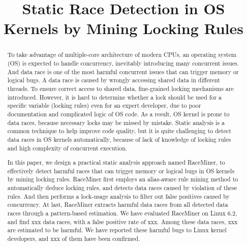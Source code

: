 \documentclass[pageno]{jpaper}
\newcommand{\sys}{\mbox{RaceMiner}\xspace}
\begin{document}
\title{
Static Race Detection in OS Kernels by Mining Locking Rules}

\date{}
\maketitle

\thispagestyle{empty}

\begin{abstract}
	
To take advantage of multiple-core architecture of modern CPUs, an operating 
system (OS) is expected to handle concurrency, inevitably introducing many 
concurrent issues. And data race is one of the most harmful concurrent issues 
that can trigger memory or logical bugs. A data race is caused by wrongly 
accessing shared data in different threads. To ensure correct access to shared 
data, fine-grained locking mechanisms are introduced. However, it is hard to 
determine whether a lock should be used for a specific variable (locking rules) 
even for an expert developer, due to poor documentation and complicated logic 
of OS code. As a result, OS kernel is prone to data races, because necessary 
locks may be missed by mistake. Static analysis is a common technique to help 
improve code quality, but it is quite challenging to detect data races in OS 
kernels automatically, because of lack of knowledge of locking rules and high 
complexity of concurrent execution.

In this paper, we design a practical static analysis approach named \sys, to 
effectively detect harmful races that can trigger memory or logical bugs in OS 
kernels by mining locking rules. \sys first employs an alias-aware rule mining 
method to automatically deduce locking rules, and detects data races caused by 
violation of these rules. And then performs a lock-usage analysis to filter out 
false positives caused by concurrency. At last, \sys extracts harmful data 
races from all detected data races through a pattern-based estimation. We have 
evaluated \sys on Linux 6.2, and find xxx data races, with a false positive 
rate of xxx. Among these data races, xxx are estimated to be harmful. We have 
reported these harmful bugs to Linux kernel developers, and xxx of them have 
been confirmed.

\end{abstract}










\footnotesize


\end{document}

